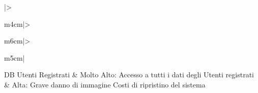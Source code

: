 \begin{center}
\begin{adjustwidth}{-1.8cm}{0cm}
{\begin{tabular}{|>\raggedright m{4cm}|>\raggedright m{6cm}|>\raggedright m{5cm}|}
                                \n      DB Utenti Registrati                               &
                                Molto Alto:\newline
                                Accesso a tutti i dati degli Utenti registrati             &
                                Alta:\newline
                                Grave danno di immagine\newline
                                Costi di ripristino del sistema
                                \n
                        \end{tabular}
                }
                \label{tab:monkeytable:monkerisk:valutaBanane}
        \end{adjustwidth}

        \begin{adjustwidth}{-2cm}{0cm}
                \centering
\end{adjustwidth}
\end{center}
